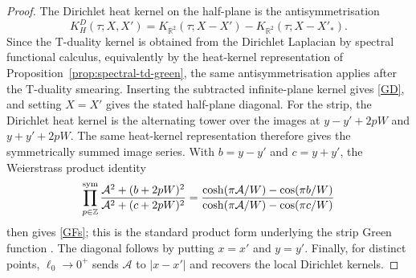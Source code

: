 \documentclass[nopacs,amsmath,amsfonts,amssymb,aps,superscriptaddress]{revtex4}
\begin{document}
\begin{proof}
The Dirichlet heat kernel on the half-plane is the antisymmetrisation
\begin{equation}
  K_H^D(\tau;X,X')=K_{\mathbb R^2}(\tau;X-X')-K_{\mathbb R^2}(\tau;X-X'_*).
\end{equation}
Since the T-duality kernel is obtained from the Dirichlet Laplacian by spectral functional calculus, equivalently by the heat-kernel representation of Proposition~\ref{prop:spectral-td-green}, the same antisymmetrisation applies after the T-duality smearing. Inserting the subtracted infinite-plane kernel gives \eqref{GD}, and setting \(X=X'\) gives the stated half-plane diagonal. For the strip, the Dirichlet heat kernel is the alternating tower over the images at \(y-y'+2pW\) and \(y+y'+2pW\). The same heat-kernel representation therefore gives the symmetrically summed image series. With \(b=y-y'\) and \(c=y+y'\), the Weierstrass product identity
\begin{equation}
  \prod_{p\in\mathbb Z}^{\rm sym}
  \frac{\mathcal A^2+(b+2pW)^2}{\mathcal A^2+(c+2pW)^2}
  =\frac{\cosh(\pi\mathcal A/W)-\cos(\pi b/W)}
  {\cosh(\pi\mathcal A/W)-\cos(\pi c/W)}
\end{equation}
then gives \eqref{GFs}; this is the standard product form underlying the strip Green function \cite{DLMF}. The diagonal follows by putting \(x=x'\) and \(y=y'\). Finally, for distinct points, \(\ell_0\to0^+\) sends \(\mathcal A\) to \(|x-x'|\) and recovers the local Dirichlet kernels.
\end{proof}
\end{document}
